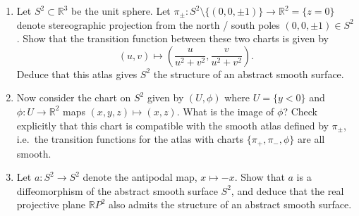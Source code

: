 \documentclass[12pt,a4paper]{article}
\theoremstyle{plain}
\theoremstyle{definition}      %
\begin{document}
	\begin{enumerate}[label=\textnormal{(\alph*)}]
		
		\item
		Let $S^2 \subset \mathbb{R}^3$ be the unit sphere.
		Let $\pi_{\pm} : S^2 \setminus \{(0,0,\pm 1)\} \to \mathbb{R}^2 = \{z=0\}$
		denote stereographic projection from the north / south poles $(0,0,\pm1)\in S^2$.
		Show that the transition function between these two charts is given by
		\[
		(u,v) \longmapsto \left( \frac{u}{u^{2}+v^{2}}, \frac{v}{u^{2}+v^{2}} \right).
		\]
		Deduce that this atlas gives $S^2$ the structure of an abstract smooth surface.
		
		\item
		Now consider the chart on $S^2$ given by $(U,\phi)$ where
		$U = \{ y < 0 \}$ and $\phi : U \to \mathbb{R}^2$ maps
		$(x,y,z) \mapsto (x,z)$.
		What is the image of $\phi$?
		Check explicitly that this chart is compatible with the smooth atlas defined
		by $\pi_{\pm}$, i.e.\ the transition functions for the atlas with charts
		$\{\pi_{+},\pi_{-},\phi\}$ are all smooth.
		
		\item
		Let $a : S^2 \to S^2$ denote the antipodal map, $x \mapsto -x$.
		Show that $a$ is a diffeomorphism of the abstract smooth surface $S^2$, and
		deduce that the real projective plane $\mathbb{R}P^{2}$ also admits the
		structure of an abstract smooth surface.
		
	\end{enumerate}
	
	
\end{document}
